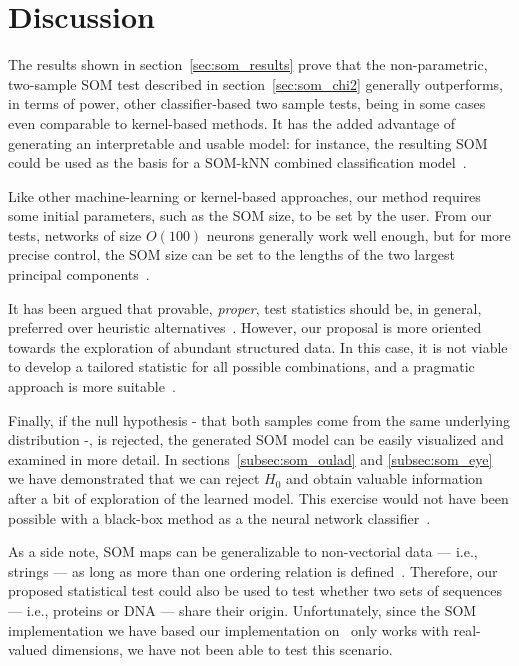 \section{Discussion}
\label{sec:som_discussion}
The results shown in section~\ref{sec:som_results} prove that the non-parametric, two-sample SOM
test described in section~\ref{sec:som_chi2} generally outperforms, in terms of power, other classifier-based
two sample tests, being in some cases even comparable to kernel-based methods. It has the added
advantage of generating an interpretable and usable model: for instance, the resulting SOM
could be used as the basis for a SOM-kNN combined classification model~\cite{silva2011som}.

Like other machine-learning or kernel-based approaches, our method requires some initial parameters,
such as the SOM size, to be set by the user. From our tests, networks of size $O(100)$ neurons
generally work well enough, but for more precise control, the SOM size can be set to the lengths
of the two largest principal components~\cite{KOHONEN201352}.

It has been argued that provable, \emph{proper}, test statistics should be, in general,
preferred over heuristic alternatives~\cite{rosenblatt2021better}. However, our proposal is
more oriented towards the exploration of abundant structured data. In this case, it is not viable
to develop a tailored statistic for all possible combinations, and a
pragmatic approach is more suitable~\cite{kim2021classification}.

Finally, if the null hypothesis - that both samples come from the same underlying distribution -,
is rejected, the generated SOM model can be easily visualized and examined in more detail.
In sections~\ref{subsec:som_oulad} and \ref{subsec:som_eye} we have demonstrated that we can
reject $H_0$ and obtain valuable
information after a bit of exploration of the learned model. This exercise would not have
been possible with a black-box method as a the neural network classifier~\cite{friedman2004multivariate}.


As a side note, SOM maps can be generalizable to non-vectorial data --- i.e., strings ---
as long as more than one ordering relation is defined~\cite{kohonen1982self, KOHONEN201352}.
Therefore, our proposed statistical test could also be used to test whether two sets of sequences
--- i.e., proteins or DNA --- share their origin. Unfortunately, since the SOM implementation we
have based our implementation on~\cite{wittek2013somoclu} only works with real-valued dimensions,
we have not been able to test this scenario.


